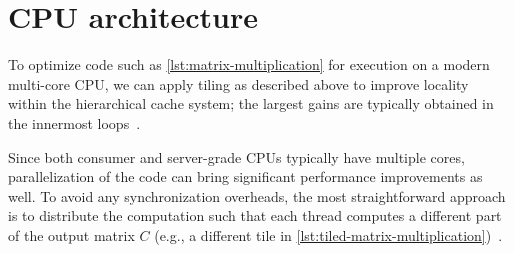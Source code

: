 


\section{CPU architecture}\label{sec:cpu-architecture}


To optimize code such as \cref{lst:matrix-multiplication} for execution on a modern multi-core CPU, we can apply tiling as described above to improve locality within the hierarchical cache system; the largest gains are typically obtained in the innermost loops~\cite{hennessy2019computer,drepper2007every}.


Since both consumer and server-grade CPUs typically have multiple cores, parallelization of the code can bring significant performance improvements as well. To avoid any synchronization overheads, the most straightforward approach is to distribute the computation such that each thread computes a different part of the output matrix $C$ (e.g., a different tile in \cref{lst:tiled-matrix-multiplication})~\cite{hennessy2019computer,dagum1998openmp}.


